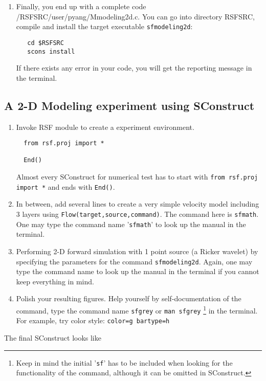 \begin{enumerate}
\begin{verbatim}
 \end{verbatim}
  
  \item Finally, you end up with a complete code /RSFSRC/user/pyang/Mmodeling2d.c. You can go into directory RSFSRC, compile and install the target executable \texttt{sfmodeling2d}:
  \begin{verbatim}
   cd $RSFSRC
   scons install
  \end{verbatim}
  If there exists any error in your code, you will get the reporting message in the terminal.   
\end{enumerate}


\subsection{A 2-D Modeling experiment using SConstruct}

\begin{enumerate}
 \item Invoke RSF module to create a experiment environment. 
\lstset{language=python,numbers=left,numberstyle=\tiny,showstringspaces=false}
 \begin{lstlisting}
  from rsf.proj import *

  End()
 \end{lstlisting}
 Almost every SConstruct for numerical test has to start with \texttt{from rsf.proj import *} and ends with \texttt{End()}.

 \item In between, add several lines to create a very simple velocity model including 3 layers using \texttt{Flow(target,source,command)}. The command here is \texttt{sfmath}. One may type the command name '\texttt{sfmath}' to look up the manual in the terminal.
 \item Performing 2-D forward simulation with 1 point source (a Ricker wavelet) by specifying the parameters for the command \texttt{sfmodeling2d}. Again, one may type the command name to look up the manual in the terminal if you cannot keep everything in mind.

 \item Polish your resulting figures. Help yourself by self-documentation of the command, type the command name \texttt{sfgrey}  or \texttt{man sfgrey} \footnote{Keep in mind the initial '\texttt{sf}' has to be included when looking for the functionality of the command, although it can be omitted in SConstruct.} in the terminal. For example, try color style: \texttt{color=g bartype=h}
\end{enumerate}
The final SConstruct looks like


